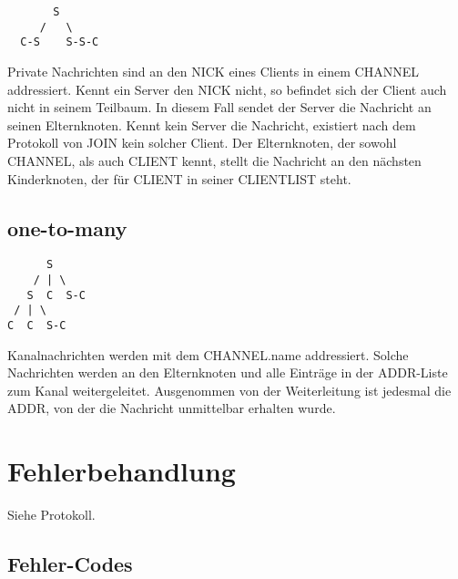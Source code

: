 \documentclass{article}
\begin{document}
\begin{lstlisting}
       S
     /   \
  C-S    S-S-C
\end{lstlisting}

Private Nachrichten sind an den NICK eines Clients in einem CHANNEL addressiert. Kennt ein Server den NICK nicht, so befindet sich der Client auch nicht in seinem Teilbaum. In diesem Fall sendet der Server die Nachricht an seinen Elternknoten. Kennt kein Server die Nachricht, existiert nach dem Protokoll von JOIN kein solcher Client. Der Elternknoten, der sowohl CHANNEL, als auch CLIENT kennt, stellt die Nachricht an den nächsten Kinderknoten, der für CLIENT in seiner CLIENTLIST steht.

\subsection{one-to-many}

\begin{lstlisting}
      S
    / | \
   S  C  S-C
 / | \
C  C  S-C
\end{lstlisting}

Kanalnachrichten werden mit dem CHANNEL.name addressiert. Solche Nachrichten werden an den Elternknoten und alle Einträge in der ADDR-Liste zum Kanal weitergeleitet. Ausgenommen von der Weiterleitung ist jedesmal die ADDR, von der die Nachricht unmittelbar erhalten wurde.


\section{Fehlerbehandlung}

Siehe Protokoll.

\subsection{Fehler-Codes}
\end{document}
